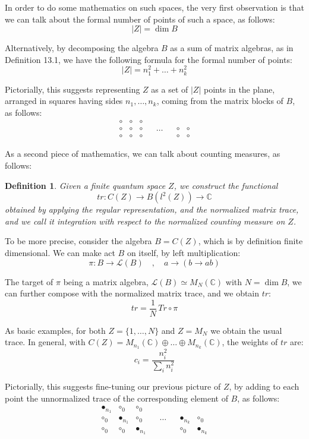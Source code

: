 \documentclass[12pt]{amsbook}
\newtheorem{definition}[theorem]{Definition}
\begin{document}
In order to do some mathematics on such spaces, the very first observation is that we can talk about the formal number of points of such a space, as follows:
$$|Z|=\dim B$$

Alternatively, by decomposing the algebra $B$ as a sum of matrix algebras, as in Definition 13.1, we have the following formula for the formal number of points:
$$|Z|=n_1^2+\ldots+n_k^2$$

Pictorially, this suggests representing $Z$ as a set of $|Z|$ points in the plane, arranged in squares having sides $n_1,\ldots,n_k$, coming from the matrix blocks of $B$, as follows:
$$\begin{matrix}
\circ&\circ&\circ\\
\circ&\circ&\circ&&\ldots&&\circ&\circ\\
\circ&\circ&\circ&&&&\circ&\circ
\end{matrix}$$

As a second piece of mathematics, we can talk about counting measures, as follows:

\begin{definition}
Given a finite quantum space $Z$, we construct the functional
$$tr:C(Z)\to B(l^2(Z))\to\mathbb C$$
obtained by applying the regular representation, and the normalized matrix trace, and we call it integration with respect to the normalized counting measure on $Z$.
\end{definition}

To be more precise, consider the algebra $B=C(Z)$, which is by definition finite dimensional. We can make act $B$ on itself, by left multiplication:
$$\pi:B\to\mathcal L(B)\quad,\quad 
a\to(b\to ab)$$

The target of $\pi$ being a matrix algebra, $\mathcal L(B)\simeq M_N(\mathbb C)$ with $N=\dim B$, we can further compose with the normalized matrix trace, and we obtain $tr$:
$$tr=\frac{1}{N}\,Tr\circ\pi$$

As basic examples, for both $Z=\{1,\ldots,N\}$ and $Z=M_N$ we obtain the usual trace. In general, with $C(Z)=M_{n_1}(\mathbb C)\oplus\ldots\oplus M_{n_k}(\mathbb C)$, the weights of $tr$ are:
$$c_i=\frac{n_i^2}{\sum_in_i^2}$$

Pictorially, this suggests fine-tuning our previous picture of $Z$, by adding to each point the unnormalized trace of the corresponding element of $B$, as follows:
$$\begin{matrix}
\bullet_{n_1}&\circ_0&\circ_0\\
\circ_0&\bullet_{n_1}&\circ_0&&\ldots&&\bullet_{n_k}&\circ_0\\
\circ_0&\circ_0&\bullet_{n_1}&&&&\circ_0&\bullet_{n_k}
\end{matrix}$$
\end{document}

